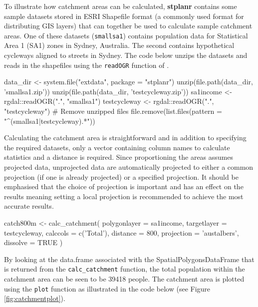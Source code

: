 \newpage

To illustrate how catchment areas can be calculated, \textbf{stplanr}
contains some sample datasets stored in ESRI Shapefile format (a
commonly used format for distributing GIS layers) that can together be
used to calculate sample catchment areas. One of these datasets
(\texttt{smallsa1}) contains population data for Statistical Area 1
(SA1) zones in Sydney, Australia. The second contains hypothetical
cycleways aligned to streets in Sydney. The code below unzips the
datasets and reads in the shapefiles using the \texttt{readOGR} function
of .

\begin{Schunk}
\begin{Sinput}
data_dir <- system.file("extdata", package = "stplanr")
unzip(file.path(data_dir, 'smallsa1.zip'))
unzip(file.path(data_dir, 'testcycleway.zip'))
sa1income <- rgdal::readOGR(".", "smallsa1")
testcycleway <- rgdal::readOGR(".", "testcycleway")
# Remove unzipped files
file.remove(list.files(pattern = "^(smallsa1|testcycleway).*"))
\end{Sinput}
\end{Schunk}

Calculating the catchment area is straightforward and in addition to
specifying the required datasets, only a vector containing column names
to calculate statistics and a distance is required. Since proportioning
the areas assumes projected data, unprojected data are automatically
projected to either a common projection (if one is already projected) or
a specified projection. It should be emphasised that the choice of
projection is important and has an effect on the results meaning setting
a local projection is recommended to achieve the most accurate results.

\begin{Schunk}
\begin{Sinput}
catch800m <- calc_catchment(
  polygonlayer = sa1income,
  targetlayer = testcycleway,
  calccols = c('Total'),
  distance = 800,
  projection = 'austalbers',
  dissolve = TRUE
)
\end{Sinput}
\end{Schunk}

By looking at the data.frame associated with the
SpatialPolygonsDataFrame that is returned from the
\texttt{calc\_catchment} function, the total population within the
catchment area can be seen to be 39418 people. The catchment area
is plotted using the
\texttt{plot} function as illustrated in
the code below (see
Figure \ref{fig:catchmentplot}).

